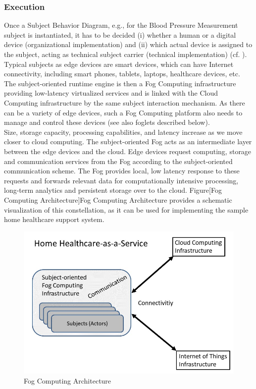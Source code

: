 \subsubsection{Execution}
Once a Subject Behavior Diagram, e.g., for the Blood Pressure Measurement subject is instantiated, it has to be decided (i) whether a human or a digital device (organizational implementation) and (ii) which actual device is assigned to the subject, acting as technical subject carrier (technical implementation) (cf. \cite{Flei12}). Typical subjects as edge devices are smart devices, which can have Internet connectivity, including smart phones, tablets, laptops, healthcare devices, etc. The subject-oriented runtime engine \cite{article:StakeHolderCentered} is then a Fog Computing infrastructure providing low-latency virtualized services and is linked with the Cloud Computing infrastructure by the same subject interaction mechanism. As there can be a variety of edge devices, such a Fog Computing platform also needs to manage and control these devices (see also foglets described below). 
\\
Size, storage capacity, processing capabilities, and latency increase as we move closer to cloud computing. The subject-oriented Fog acts as an intermediate layer between the edge devices and the cloud. Edge devices request computing, storage and communication services from the Fog according to the subject-oriented communication scheme. The Fog provides local, low latency response to these requests and forwards relevant data for computationally intensive processing, long-term analytics and persistent storage over to the cloud. Figure[Fog Computing Architecture]{Fog Computing Architecture} provides a schematic visualization of this constellation, as it can be used for implementing the sample home healthcare support system.

\begin{figure}[htbp]
	\centering
	\includegraphics[width=0.6\linewidth] {Figures/Chapter5/Fog/FogArch.jpg}
	\caption[Fog Computing Architecture]{Fog Computing Architecture}
	\label{fig:FogArch}
\end{figure}


